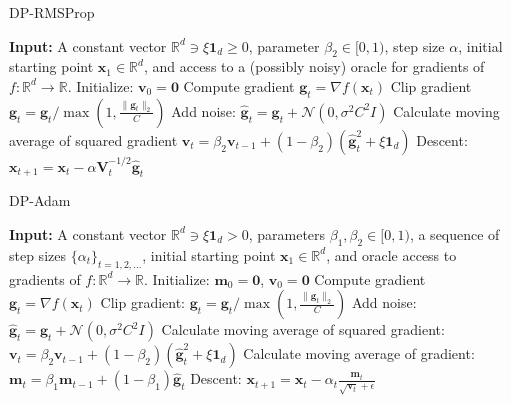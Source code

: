 \begin{algorithm}[H]
    \caption{DP-RMSProp}
    \label{alg:rmsprop}
    \begin{algorithmic}[1]
        \State \textbf{Input:} A constant vector $\mathbb{R}^d \ni \xi \mathbf{1}_d \geq 0$, parameter $\beta_2 \in [0, 1)$, step size $\alpha$, initial starting point $\mathbf{x}_1 \in \mathbb{R}^d$, and access to a (possibly noisy) oracle for gradients of $f : \mathbb{R}^d \rightarrow \mathbb{R}$.
        \State Initialize: $\mathbf{v}_0 = \mathbf{0}$
            \State Compute gradient $\mathbf{g}_t = \nabla f(\mathbf{x}_t)$
            \State Clip gradient $\mathbf{g}_t = \mathbf{g}_t / \max(1, \frac{\lVert \mathbf{g}_t \rVert_2}{C})$
            \State Add noise: $\hat{\mathbf{g}}_t = \mathbf{g}_t + \mathcal{N}(0, \sigma^2 C^2 I)$
            \State Calculate moving average of squared gradient $\mathbf{v}_t = \beta_2 \mathbf{v}_{t-1} + (1 - \beta_2)(\hat{\mathbf{g}}_t^2 + \xi \mathbf{1}_d)$
            \State Descent: $\mathbf{x}_{t+1} = \mathbf{x}_t - \alpha \mathbf{V}_t^{-1/2} \hat{\mathbf{g}}_t$
        \EndFor
    \end{algorithmic}
\end{algorithm}

\begin{algorithm}[H]
    \caption{DP-Adam}
    \label{alg:adam}
    \begin{algorithmic}[1]
        \State \textbf{Input:} A constant vector $\mathbb{R}^d \ni \xi \mathbf{1}_d > 0$, parameters $\beta_1, \beta_2 \in [0, 1)$, a sequence of step sizes $\{\alpha_t\}_{t=1,2,\dots}$, initial starting point $\mathbf{x}_1 \in \mathbb{R}^d$, and oracle access to gradients of $f : \mathbb{R}^d \rightarrow \mathbb{R}$.
        \State Initialize: $\mathbf{m}_0 = \mathbf{0}$, $\mathbf{v}_0 = \mathbf{0}$
            \State Compute gradient $\mathbf{g}_t = \nabla f(\mathbf{x}_t)$
            \State Clip gradient: $\mathbf{g}_t = \mathbf{g}_t / \max(1, \frac{\lVert \mathbf{g}_t \rVert_2}{C})$
            \State Add noise: $\hat{\mathbf{g}}_t = \mathbf{g}_t + \mathcal{N}(0, \sigma^2 C^2 I)$
            \State Calculate moving average of squared gradient: $\mathbf{v}_t = \beta_2 \mathbf{v}_{t-1} + (1 - \beta_2)(\hat{\mathbf{g}}_t^2 + \xi \mathbf{1}_d)$
            \State Calculate moving average of gradient: $\mathbf{m}_t = \beta_1 \mathbf{m}_{t-1} + (1 - \beta_1) \hat{\mathbf{g}}_t$
            \State Descent: $\mathbf{x}_{t+1} = \mathbf{x}_t - \alpha_t \frac{\mathbf{m}_t}{\sqrt{\mathbf{v}_t} + \epsilon}$
        \EndFor
    \end{algorithmic}
\end{algorithm}


